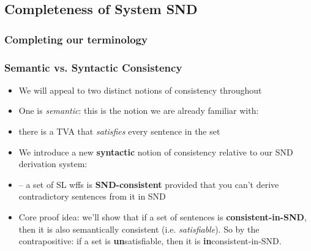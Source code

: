 \subsection{Completeness of System SND}

\subsubsection{Completing our terminology}

\begin{frame}
\frametitle{Semantic vs. Syntactic Consistency}

\begin{itemize}[<+->]

\item We will appeal to two distinct notions of consistency throughout

\item One is \emph{semantic}: this is the notion we are already familiar with:

\item[] there is a TVA that \emph{satisfies} every sentence in the set

\item We introduce a new \textbf{syntactic} notion of consistency relative to our SND derivation system: 

\item[] -- a set of SL wffs is \textbf{SND-consistent} provided that you can't derive contradictory sentences from it in SND

\item Core proof idea: we'll show that if a set of sentences is \textbf{consistent-in-SND}, then it is also semantically consistent (i.e. \emph{satisfiable}). So by the contrapositive: if a set is \textbf{\textcolor{OGlyallpink}{un}}satisfiable, then it is \textbf{\textcolor{OGlyallpink}{in}}consistent-in-SND. 

\end{itemize}
\end{frame}


